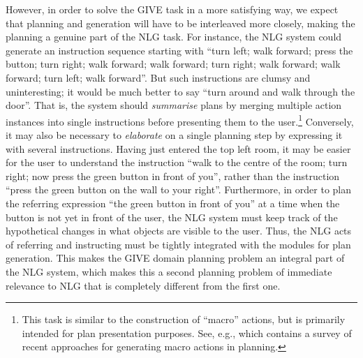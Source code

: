 However, in order to solve the GIVE task in a more satisfying way, we
expect that planning and generation will have to be interleaved more
closely, making the planning a genuine part of the NLG task. For
instance, the NLG system could generate an instruction sequence
starting with ``turn left; walk forward; press the button; turn right;
walk forward; walk forward; turn right; walk forward; walk forward;
turn left; walk forward''. But such instructions are clumsy and
uninteresting; it would be much better to say ``turn around and walk
through the door''. That is, the system should \emph{summarise} plans
by merging multiple action instances into single instructions before
presenting them to the user.\footnote{This task is similar to the
  construction of ``macro'' actions, but is primarily intended for
  plan presentation purposes. See, e.g., \citep{Botea-etal:05} which
  contains a survey of recent approaches for generating macro actions
  in planning.}  Conversely, it may also be necessary to
\emph{elaborate} on a single planning step by expressing it with
several instructions. Having just entered the top left room, it may be
easier for the user to understand the instruction ``walk to the centre
of the room; turn right; now press the green button in front of you'',
rather than the instruction ``press the green button on the wall to
your right''. Furthermore, in order to plan the referring expression
``the green button in front of you'' at a time when the button is not
yet in front of the user, the NLG system must keep track of the
hypothetical changes in what objects are visible to the user. Thus,
the NLG acts of referring and instructing must be tightly integrated
with the modules for plan generation. This makes the GIVE domain
planning problem an integral part of the NLG system, which makes this
a second planning problem of immediate relevance to NLG that is
completely different from the first one.

